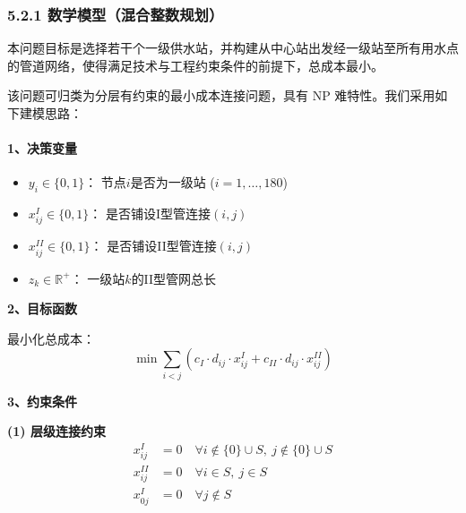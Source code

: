 \documentclass[12pt,a4paper]{article}
\begin{document}
\subsubsection*{5.2.1 数学模型（混合整数规划）}
本问题目标是选择若干个一级供水站，并构建从中心站出发经一级站至所有用水点的管道网络，使得满足技术与工程约束条件的前提下，总成本最小。

该问题可归类为分层有约束的最小成本连接问题，具有 NP 难特性。我们采用如下建模思路：



\paragraph{1、决策变量}
\begin{itemize}
\item $y_i \in \{0,1\}$：    节点$i$是否为一级站 ($i=1,\dots,180$)

\item $x_{ij}^I \in \{0,1\}$：    是否铺设I型管连接$(i,j)$

\item $x_{ij}^{II} \in \{0,1\}$：    是否铺设II型管连接$(i,j)$

\item $z_k \in \mathbb{R}^+$：    一级站$k$的II型管网总长
\end{itemize}

\vspace{1em}
\noindent\textbf{2、目标函数}

\vspace{0.5em}
最小化总成本：
\[
\min \sum_{i<j} \left( c_I \cdot d_{ij} \cdot x_{ij}^I + c_{II} \cdot d_{ij} \cdot x_{ij}^{II} \right)
\]

\vspace{1em}
\noindent\textbf{3、约束条件}

\vspace{0.5em}
\textbf{(1) 层级连接约束}
\begin{align*}
x_{ij}^I &= 0 \quad \forall i \notin \{0\} \cup S,\ j \notin \{0\} \cup S \\
x_{ij}^{II} &= 0 \quad \forall i \in S,\ j \in S \\
x_{0j}^I &= 0 \quad \forall j \notin S 
\end{align*}
\end{document}
